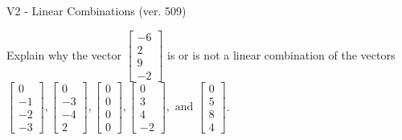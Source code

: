 \begin{exercise}
  \begin{exerciseTitle}V2 - Linear Combinations (ver. 509)\end{exerciseTitle}
  \begin{exerciseStatement}
    Explain why the vector \(\left[\begin{array}{c}
-6 \\
2 \\
9 \\
-2
\end{array}\right]\)  is or is not a linear 
	combination of the vectors \(\left[\begin{array}{c}
0 \\
-1 \\
-2 \\
-3
\end{array}\right] , \left[\begin{array}{c}
0 \\
-3 \\
-4 \\
2
\end{array}\right] , \left[\begin{array}{c}
0 \\
0 \\
0 \\
0
\end{array}\right] , \left[\begin{array}{c}
0 \\
3 \\
4 \\
-2
\end{array}\right] , \text{ and } \left[\begin{array}{c}
0 \\
5 \\
8 \\
4
\end{array}\right]\).
	



\end{exerciseStatement}
\end{exercise}
